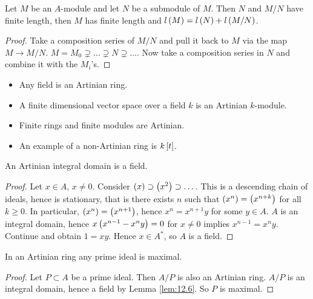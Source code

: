 \begin{proposition}
Let $ M $ be an $ A $-module and let $ N $ be a submodule of $ M $. Then $ N $ and $ M / N $ have finite length, then $ M $ has finite length and $ l\rb{M} = l\rb{N} + l\rb{M / N} $.
\end{proposition}

\begin{proof}
Take a composition series of $ M / N $ and pull it back to $ M $ via the map $ M \to M / N $. $ M = M_0 \supsetneq \dots \supsetneq N \supsetneq \dots $. Now take a composition series in $ N $ and combine it with the $ M_i $'s.
\end{proof}

\pagebreak


\begin{example*}
\hfill
\begin{itemize}
\item Any field is an Artinian ring.
\item A finite dimensional vector space over a field $ k $ is an Artinian $ k $-module.
\item Finite rings and finite modules are Artinian.
\item An example of a non-Artinian ring is $ k\sb{t} $.
\end{itemize}
\end{example*}

\begin{lemma}
\label{lem:12.6}
An Artinian integral domain is a field.
\end{lemma}

\begin{proof}
Let $ x \in A $, $ x \ne 0 $. Consider $ \rb{x} \supset \rb{x^2} \supset \dots $. This is a descending chain of ideals, hence is stationary, that is there exists $ n $ such that $ \rb{x^n} = \rb{x^{n + k}} $ for all $ k \ge 0 $. In particular, $ \rb{x^n} = \rb{x^{n + 1}} $, hence $ x^n = x^{n + 1}y $ for some $ y \in A $. $ A $ is an integral domain, hence $ x\rb{x^{n - 1} - x^ny} = 0 $ for $ x \ne 0 $ implies $ x^{n - 1} = x^ny $. Continue and obtain $ 1 = xy $. Hence $ x \in A^* $, so $ A $ is a field.
\end{proof}

\begin{corollary}
\label{cor:12.7}
In an Artinian ring any prime ideal is maximal.
\end{corollary}

\begin{proof}
Let $ P \subset A $ be a prime ideal. Then $ A / P $ is also an Artinian ring. $ A / P $ is an integral domain, hence a field by Lemma \ref{lem:12.6}. So $ P $ is maximal.
\end{proof}

